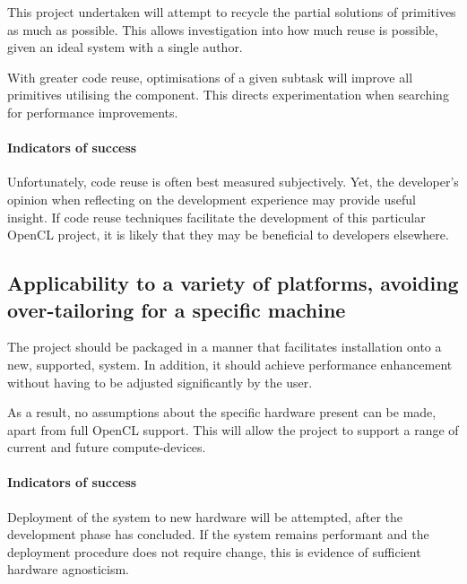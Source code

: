 This project undertaken will attempt to recycle the partial solutions of primitives as much as possible. This allows investigation into how much reuse is possible, given an ideal system with a single author.

With greater code reuse, optimisations of a given subtask will improve all primitives utilising the component. This directs experimentation when searching for performance improvements.

\paragraph*{Indicators of success}
Unfortunately, code reuse is often best measured subjectively. Yet, the developer's opinion when reflecting on the development experience may provide useful insight. If code reuse techniques facilitate the development of this particular \ac{OpenCL} project, it is likely that they may be beneficial to developers elsewhere.

\subsection{Applicability to a variety of platforms, avoiding over-tailoring for a specific machine}
The project should be packaged in a manner that facilitates installation onto a new, supported, system. In addition, it should achieve performance enhancement without having to be adjusted significantly by the user.

As a result, no assumptions about the specific hardware present can be made, apart from full \ac{OpenCL} support. This will allow the project to support a range of current and future compute-devices.

\paragraph*{Indicators of success}
Deployment of the system to new hardware will be attempted, after the development phase has concluded. If the system remains performant and the deployment procedure does not require change, this is evidence of sufficient hardware agnosticism.
